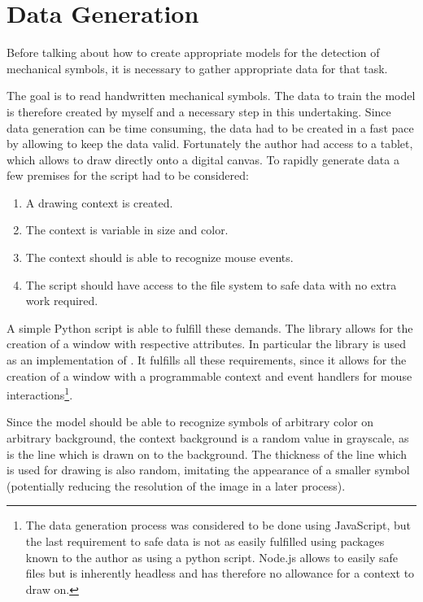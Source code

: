 \section{Data Generation}

Before talking about how to create appropriate models for the detection of
mechanical symbols, it is necessary to gather appropriate data for that task.

The goal is to read handwritten mechanical symbols.
The data to train the model is therefore created by myself and a necessary step in this undertaking.
Since data generation can be time consuming, the data had to be created in a fast pace by allowing to keep the data valid.
Fortunately the author had access to a tablet, which allows to draw directly onto a digital canvas.
To rapidly generate data a few premises for the script had to be considered:
\begin{enumerate}
    \item A drawing context is created.
    \item The context is variable in size and color.
    \item The context should is able to recognize mouse events.
    \item The script should have access to the file system to safe data with no extra work required.
\end{enumerate}

A simple Python script is able to fulfill these demands.
The library  \cite{OpenCV2019} allows for the creation of a window with respective attributes. In particular the library  \cite{Heinisuo2019} is used as an implementation of .
It fulfills all these requirements, since it allows for the creation of a window with a programmable context and event handlers for mouse interactions\footnote{ The data generation process was considered to be done using JavaScript, but the last requirement to safe data is not as easily fulfilled using packages known to the author as using a python script. Node.js allows to easily safe files but is inherently headless and has therefore no allowance for a context to draw on. }.

Since the model should be able to recognize symbols of arbitrary color on arbitrary background, the context background is a random value in grayscale, as is the line which is drawn on to the background.
The thickness of the line which is used for drawing is also random, imitating the appearance of a smaller symbol (potentially reducing the resolution of the image in a later process).

